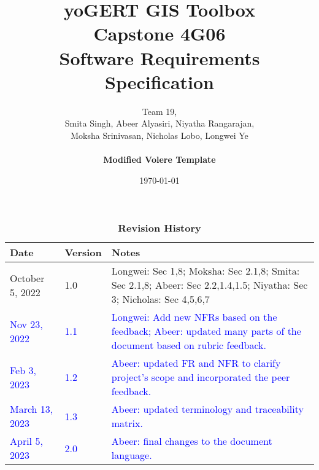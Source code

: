 \documentclass[12pt, titlepage]{article}
\title{\textbf{yoGERT GIS Toolbox}\\ Capstone 4G06\\ Software Requirements Specification}
\author{Team 19,
		\\ Smita Singh, Abeer Alyasiri, Niyatha Rangarajan,\\ Moksha Srinivasan, Nicholas Lobo, Longwei Ye \\\\
		\textbf{Modified Volere Template}
}
\date{\today}
\begin{document}
\nocite{*}
\maketitle

\tableofcontents
\listoftables
\listoffigures

\begin{table}[H]
\caption{\bf Revision History}
\begin{tabularx}{\textwidth}{p{3cm}p{2cm}X}
\toprule {\bf Date} & {\bf Version} & {\bf Notes}\\
\midrule
October 5, 2022 & 1.0 & Longwei: Sec 1,8; Moksha: Sec 2.1,8; Smita: Sec 2.1,8; Abeer: Sec 2.2,1.4,1.5; Niyatha: Sec 3; Nicholas: Sec 4,5,6,7 \\
\textcolor{blue}{Nov 23, 2022} & \textcolor{blue}{1.1} & \textcolor{blue}{Longwei: Add new NFRs based on the feedback; Abeer: updated many parts of the document based on rubric feedback.}\\
\textcolor{blue}{Feb 3, 2023} & \textcolor{blue}{1.2} & \textcolor{blue}{Abeer: updated FR and NFR to clarify project's scope and incorporated the peer feedback.}\\
\textcolor{blue}{March 13, 2023} & \textcolor{blue}{1.3} & \textcolor{blue}{Abeer: updated terminology and traceability matrix.}\\
\textcolor{blue}{April 5, 2023} & \textcolor{blue}{2.0} & \textcolor{blue}{Abeer: final changes to the document language.}\\
\bottomrule
\end{tabularx}
\end{table}

\newpage


\end{document}
